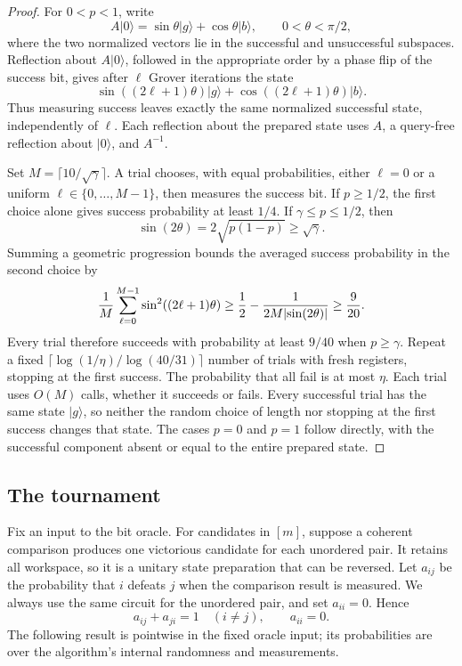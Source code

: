 \documentclass[11pt]{article}
\theoremstyle{definition}
\DeclarePairedDelimiter{\abs}{\lvert}{\rvert}
\begin{document}
\begin{proof}
For $0<p<1$, write
\[
 A\lvert0\rangle
   =\sin\theta\lvert g\rangle+\cos\theta\lvert b\rangle,
 \qquad 0<\theta<\pi/2,
\]
where the two normalized vectors lie in the successful and unsuccessful
subspaces. Reflection about $A\lvert0\rangle$, followed in the appropriate
order by a phase flip of the success bit, gives after $\ell$ Grover
iterations the state
\[
 \sin((2\ell+1)\theta)\lvert g\rangle
  +\cos((2\ell+1)\theta)\lvert b\rangle.
\]
Thus measuring success leaves exactly the same normalized successful
state, independently of $\ell$. Each reflection about the prepared state
uses $A$, a query-free reflection about $\lvert0\rangle$, and $A^{-1}$.

Set $M=\lceil10/\sqrt\gamma\rceil$. A trial chooses, with equal
probabilities, either $\ell=0$ or a uniform $\ell\in\{0,\ldots,M-1\}$,
then measures the success bit. If $p\ge1/2$, the first choice alone
gives success probability at least $1/4$. If $\gamma\le p\le1/2$,
then
\[
 \sin(2\theta)=2\sqrt{p(1-p)}\ge\sqrt\gamma.
\]
Summing a geometric progression bounds the averaged success probability
in the second choice by
\begin{equation}\label{eq:grover-average}
 \frac1M\sum_{\ell=0}^{M-1}\sin^2((2\ell+1)\theta)
 \ge \frac12-\frac{1}{2M\abs{\sin(2\theta)}}
 \ge\frac{9}{20}.
\end{equation}
Every trial therefore succeeds with probability at least $9/40$ when
$p\ge\gamma$. Repeat a fixed
$\lceil\log(1/\eta)/\log(40/31)\rceil$ number of trials with fresh
registers, stopping at the first success. The probability that all fail
is at most $\eta$. Each trial uses $O(M)$ calls, whether it succeeds or
fails. Every successful trial has the same state $\lvert g\rangle$, so
neither the random choice of length nor stopping at the first success
changes that state. The cases $p=0$ and $p=1$ follow directly, with the
successful component absent or equal to the entire prepared state.
\end{proof}

\subsection{The tournament}

Fix an input to the bit oracle. For candidates in $[m]$, suppose a
coherent comparison produces one victorious candidate for each unordered
pair. It retains all workspace, so it is a unitary state preparation
that can be reversed. Let $a_{ij}$ be the probability that $i$ defeats
$j$ when the comparison result is measured. We always use the same
circuit for the unordered pair, and set $a_{ii}=0$. Hence
\begin{equation}\label{eq:complementarity}
 a_{ij}+a_{ji}=1\quad(i\ne j),\qquad a_{ii}=0.
\end{equation}
The following result is pointwise in the fixed
oracle input; its probabilities are over the algorithm's internal
randomness and measurements.
\end{document}
